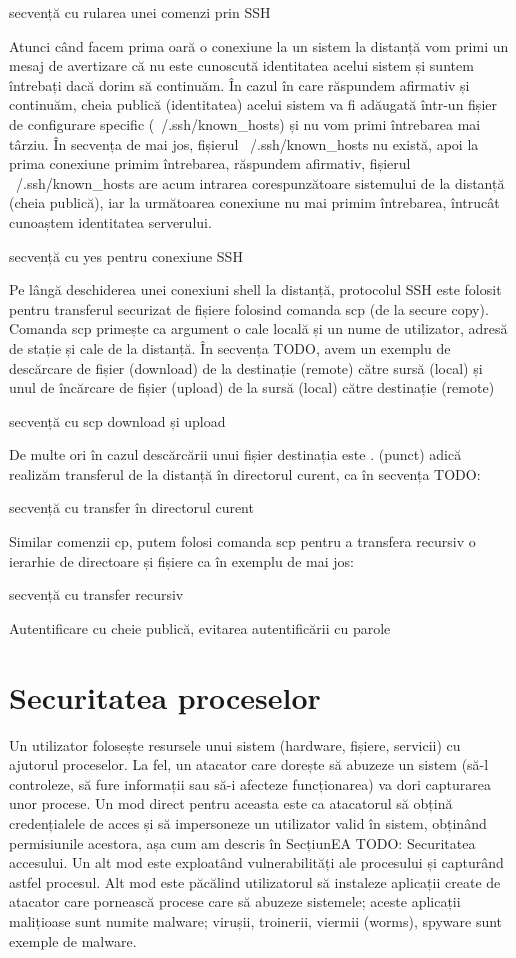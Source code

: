 secvență cu rularea unei comenzi prin SSH

Atunci când facem prima oară o conexiune la un sistem la distanță vom primi un mesaj de avertizare că nu este cunoscută identitatea acelui sistem și suntem întrebați dacă dorim să continuăm. În cazul în care răspundem afirmativ și continuăm, cheia publică (identitatea) acelui sistem va fi adăugată într-un fișier de configurare specific (~/.ssh/known_hosts) și nu vom primi întrebarea mai târziu. În secvența de mai jos, fișierul ~/.ssh/known_hosts nu există, apoi la prima conexiune primim întrebarea, răspundem afirmativ, fișierul ~/.ssh/known_hosts are acum intrarea corespunzătoare sistemului de la distanță (cheia publică), iar la următoarea conexiune nu mai primim întrebarea, întrucât cunoaștem identitatea serverului.

secvență cu yes pentru conexiune SSH

Pe lângă deschiderea unei conexiuni shell la distanță, protocolul SSH este folosit pentru transferul securizat de fișiere folosind comanda scp (de la secure copy). Comanda scp primește ca argument o cale locală și un nume de utilizator, adresă de stație și cale de la distanță. În secvența TODO, avem un exemplu de descărcare de fișier (download) de la destinație (remote) către sursă (local) și unul de încărcare de fișier (upload) de la sursă (local) către destinație (remote)

secvență cu scp download și upload

De multe ori în cazul descărcării unui fișier destinația este . (punct) adică realizăm transferul de la distanță în directorul curent, ca în secvența TODO:

secvență cu transfer în directorul curent

Similar comenzii cp, putem folosi comanda scp pentru a transfera recursiv o ierarhie de directoare și fișiere ca în exemplu de mai jos:

secvență cu transfer recursiv

Autentificare cu cheie publică, evitarea autentificării cu parole

\section{Securitatea proceselor}
\label{sec:sec:process}

Un utilizator folosește resursele unui sistem (hardware, fișiere, servicii) cu ajutorul proceselor. La fel, un atacator care dorește să abuzeze un sistem (să-l controleze, să fure informații sau să-i afecteze funcționarea) va dori capturarea unor procese. Un mod direct pentru aceasta este ca atacatorul să obțină credențialele de acces și să impersoneze un utilizator valid în sistem, obținând permisiunile acestora, așa cum am descris în SecțiunEA TODO: Securitatea accesului. Un alt mod este exploatând vulnerabilități ale procesului și capturând astfel procesul. Alt mod este păcălind utilizatorul să instaleze aplicații create de atacator care pornească procese care să abuzeze sistemele; aceste aplicații malițioase sunt numite malware; virușii, troinerii, viermii (worms), spyware sunt exemple de malware.

